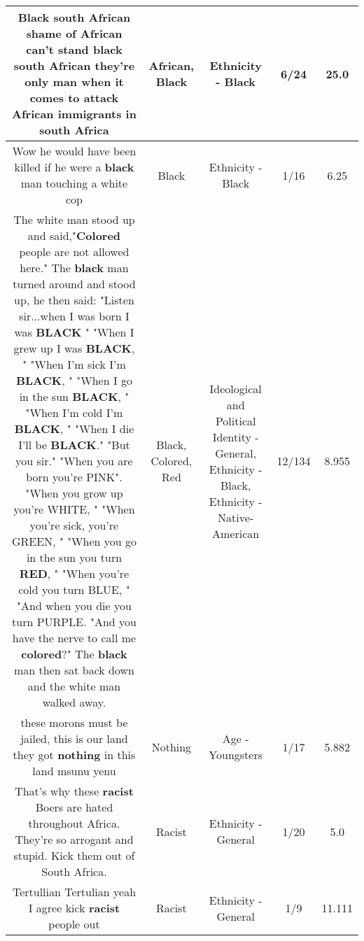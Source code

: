 \documentclass[11pt]{article}
\newlength\mylength
\begin{document}
\begin{center}
\begin{longtable}{|C{.65\mylength}|C{.30\mylength}|C{.12\mylength}|C{.12\mylength}|C{.12\mylength}|}
  \small Black south \textbf{African} shame of \textbf{African} can't stand \textbf{black} south \textbf{African} they're only man when it comes to attack \textbf{African} immigrants in south Africa\normalsize   & African, Black & Ethnicity - Black & 6/24 & 25.0 \\  \hline
  \small Wow he would have been killed if he were a \textbf{black} man touching a white cop\normalsize   & Black & Ethnicity - Black & 1/16 & 6.25 \\  \hline
  \small The white man stood up and said,"\textbf{Colored} people are not allowed here." The \textbf{black} man turned around and stood up, he then said: "Listen sir...when I was born I was \textbf{BLACK} " "When I grew up I was \textbf{BLACK}, " "When I'm sick I'm \textbf{BLACK}, " "When I go in the sun \textbf{BLACK}, " "When I'm cold I'm \textbf{BLACK}, " "When I die I'll be \textbf{BLACK}." "But you sir." "When you are born you're PINK". "When you grow up you're WHITE, " "When you're sick, you're GREEN, " "When you go in the sun you turn \textbf{R\textbf{ED}}, " "When you're cold you turn BLUE, " "And when you die you turn PURPLE. "And you have the nerve to call me \textbf{colored}?" The \textbf{black} man then sat back down and the white man walked away.\normalsize   & Black, Colored, Red &  Ideological and Political Identity - General, Ethnicity - Black, Ethnicity - Native-American & 12/134 & 8.955 \\  \hline
  \small these morons must be jailed, this is our land they got \textbf{nothing} in this land msunu yenu\normalsize   & Nothing & Age - Youngsters & 1/17 & 5.882 \\  \hline
  \small That's why these \textbf{racist} Boers are hated throughout  Africa. They're so arrogant and stupid. Kick them out of South Africa.\normalsize   & Racist & Ethnicity - General & 1/20 & 5.0 \\  \hline
  \small Tertullian Tertulian yeah I agree kick \textbf{racist} people out\normalsize   & Racist & Ethnicity - General & 1/9 & 11.111 \\  \hline

\end{longtable}
\end{center}
\end{document}
